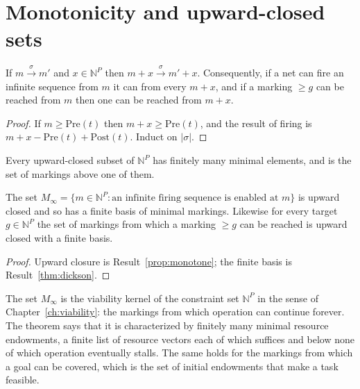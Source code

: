 \section{Monotonicity and upward-closed sets}

\begin{newresult}[Monotonicity]\label{prop:monotone}
If $m\xrightarrow{\sigma}m'$ and $x\in\mathbb N^{P}$ then $m+x\xrightarrow{\sigma}m'+x$. Consequently, if a net can fire an infinite sequence from $m$ it can from every $m+x$, and if a marking $\ge g$ can be reached from $m$ then one can be reached from $m+x$.
\end{newresult}
\begin{proof}
If $m\ge\mathrm{Pre}(t)$ then $m+x\ge\mathrm{Pre}(t)$, and the result of firing is $m+x-\mathrm{Pre}(t)+\mathrm{Post}(t)$. Induct on $|\sigma|$.
\end{proof}

\begin{established}\label{thm:dickson}
Every upward-closed subset of $\mathbb N^{P}$ has finitely many minimal elements, and is the set of markings above one of them.
\end{established}

\begin{newresult}\label{thm:upward}
The set $M_\infty=\{m\in\mathbb N^{P}:\text{an infinite firing sequence is enabled at }m\}$ is upward closed and so has a finite basis of minimal markings. Likewise for every target $g\in\mathbb N^{P}$ the set of markings from which a marking $\ge g$ can be reached is upward closed with a finite basis.
\end{newresult}
\begin{proof}
Upward closure is Result~\ref{prop:monotone}; the finite basis is Result~\ref{thm:dickson}.
\end{proof}

The set $M_\infty$ is the viability kernel of the constraint set $\mathbb N^{P}$ in the sense of Chapter~\ref{ch:viability}: the markings from which operation can continue forever. The theorem says that it is characterized by finitely many minimal resource endowments, a finite list of resource vectors each of which suffices and below none of which operation eventually stalls. The same holds for the markings from which a goal can be covered, which is the set of initial endowments that make a task feasible.

